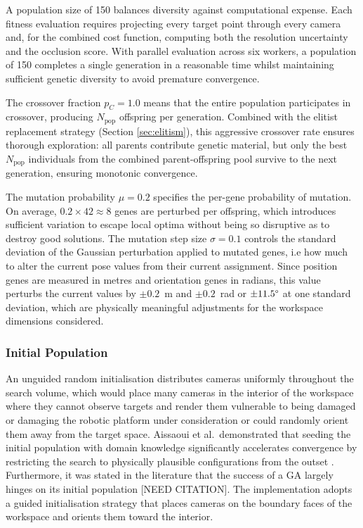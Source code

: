 A population size of 150 balances diversity against computational expense. Each fitness evaluation requires projecting every target point through every camera and, for the combined cost function, computing both the resolution uncertainty and the occlusion score. With parallel evaluation across six workers, a population of 150 completes a single generation in a reasonable time whilst maintaining sufficient genetic diversity to avoid premature convergence.

The crossover fraction $p_C = 1.0$ means that the entire population participates in crossover, producing $N_{\text{pop}}$ offspring per generation. Combined with the elitist replacement strategy (Section \ref{sec:elitism}), this aggressive crossover rate ensures thorough exploration: all parents contribute genetic material, but only the best $N_{\text{pop}}$ individuals from the combined parent-offspring pool survive to the next generation, ensuring monotonic convergence.

The mutation probability $\mu = 0.2$ specifies the per-gene probability of mutation. On average, $0.2 \times 42 \approx 8$ genes are perturbed per offspring, which introduces sufficient variation to escape local optima without being so disruptive as to destroy good solutions. The mutation step size $\sigma = 0.1$ controls the standard deviation of the Gaussian perturbation applied to mutated genes, i.e how much to alter the current pose values from their current assignment. Since position genes are measured in metres and orientation genes in radians, this value perturbs the current values by $\pm 0.2$~m and $\pm 0.2$~rad or $\pm 11.5 \degree$ at one standard deviation, which are physically meaningful adjustments for the workspace dimensions considered.

\subsubsection{Initial Population}
\label{sec:initial-pop}

An unguided random initialisation distributes cameras uniformly throughout the search volume, which would place many cameras in the interior of the workspace where they cannot observe targets and render them vulnerable to being damaged or damaging the robotic platform under consideration or could randomly orient them away from the target space. Aissaoui et al.\ demonstrated that seeding the initial population with domain knowledge significantly accelerates convergence by restricting the search to physically plausible configurations from the outset \parencite{aissaouiDesigningCameraPlacement2018}. Furthermore, it was stated in the literature that the success of a \gls{GA} largely hinges on its initial population [NEED CITATION]. The implementation adopts a guided initialisation strategy that places cameras on the boundary faces of the workspace and orients them toward the interior.

